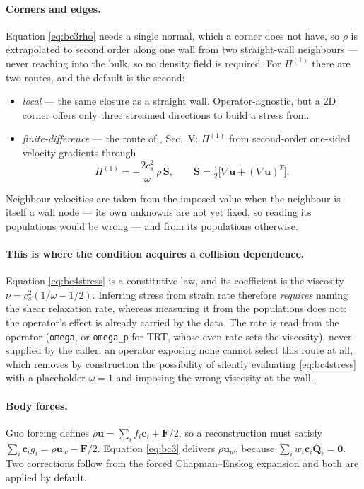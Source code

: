 \documentclass[11pt,a4paper]{article}
\newcommand{\code}[1]{\texttt{\small #1}}
\newcommand{\cs}{c_s}
\newcommand{\ci}{\bm{c}_i}
\newcommand{\uu}{\bm{u}}
\begin{document}
\paragraph{Corners and edges.} Equation \eqref{eq:bc3rho} needs a single normal,
which a corner does not have, so $\rho$ is extrapolated to second order along one
wall from two straight-wall neighbours --- never reaching into the bulk, so no
density field is required. For $\Pi^{(1)}$ there are two routes, and the default
is the second:
\begin{itemize}\itemsep2pt
  \item \emph{local} --- the same closure as a straight wall. Operator-agnostic,
        but a 2D corner offers only three streamed directions to build a stress
        from.
  \item \emph{finite-difference} --- the route of \cite{latt2008}, Sec.~V:
        $\Pi^{(1)}$ from second-order one-sided velocity gradients through
        \begin{equation}
          \Pi^{(1)} = -\frac{2\cs^2}{\omega}\,\rho\,\bm{S},
          \qquad \bm{S} = \tfrac12\big[\nabla\uu + (\nabla\uu)^{T}\big].
          \label{eq:bc4stress}
        \end{equation}
\end{itemize}
Neighbour velocities are taken from the imposed value when the neighbour is
itself a wall node --- its own unknowns are not yet fixed, so reading its
populations would be wrong --- and from its populations otherwise.

\paragraph{This is where the condition acquires a collision dependence.}
Equation \eqref{eq:bc4stress} is a constitutive law, and its coefficient is the
viscosity $\nu=\cs^2(1/\omega-1/2)$. Inferring stress from strain rate therefore
\emph{requires} naming the shear relaxation rate, whereas measuring it from the
populations does not: the operator's effect is already carried by the data. The
rate is read from the operator (\code{omega}, or \code{omega\_p} for TRT, whose
even rate sets the viscosity), never supplied by the caller; an operator
exposing none cannot select this route at all, which removes by construction the
possibility of silently evaluating \eqref{eq:bc4stress} with a placeholder
$\omega=1$ and imposing the wrong viscosity at the wall.

\paragraph{Body forces.} Guo forcing defines
$\rho\uu=\sum_i f_i\ci+\bm F/2$, so a reconstruction must satisfy
$\sum_i\ci g_i=\rho\uu_w-\bm F/2$. Equation \eqref{eq:bc3} delivers
$\rho\uu_w$, because $\sum_i w_i\ci\bm Q_i=\bm0$. Two corrections follow from
the forced Chapman--Enskog expansion and both are applied by default.
\end{document}
